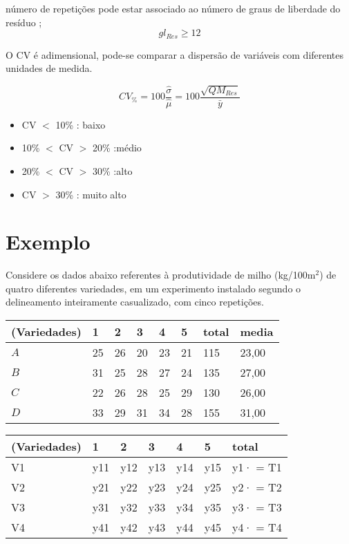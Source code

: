 \documentclass[
]{book}
\begin{document}
número de repetições pode estar associado ao número de graus de liberdade do resíduo ; \[gl_{Res} \geq 12\]

O CV é adimensional, pode-se comparar a dispersão de variáveis
com diferentes unidades de medida.

\[\displaystyle{CV_{\%} = 100\frac{\hat{\sigma}}{\hat{\mu}} = 100\frac{\sqrt{QM_{Res}}}{\bar{y}}}\]

\begin{itemize}
\item
  CV \(<\) 10\% : baixo
\item
  10\% \(<\) CV \(>\) 20\% :médio
\item
  20\% \(<\) CV \(>\) 30\% :alto
\item
  CV \(>\) 30\% : muito alto
\end{itemize}

\hypertarget{exemplo-1}{%
\section{Exemplo}\label{exemplo-1}}

Considere os dados abaixo referentes à produtividade de milho (kg/100m\(^2\)) de quatro diferentes variedades, em um experimento instalado segundo o delineamento inteiramente casualizado, com cinco repetições.

\begin{longtable}[]{@{}llllllll@{}}
\toprule()
(Variedades) & 1 & 2 & 3 & 4 & 5 & total & media \\
\midrule()
\endhead
\(A\) & 25 & 26 & 20 & 23 & 21 & 115 & 23,00 \\
\(B\) & 31 & 25 & 28 & 27 & 24 & 135 & 27,00 \\
\(C\) & 22 & 26 & 28 & 25 & 29 & 130 & 26,00 \\
\(D\) & 33 & 29 & 31 & 34 & 28 & 155 & 31,00 \\
\bottomrule()
\end{longtable}

\begin{longtable}[]{@{}lllllll@{}}
\toprule()
(Variedades) & 1 & 2 & 3 & 4 & 5 & total \\
\midrule()
\endhead
V1 & y11 & y12 & y13 & y14 & y15 & y1· = T1 \\
V2 & y21 & y22 & y23 & y24 & y25 & y2· = T2 \\
V3 & y31 & y32 & y33 & y34 & y35 & y3· = T3 \\
V4 & y41 & y42 & y43 & y44 & y45 & y4· = T4 \\
\bottomrule()
\end{longtable}
\end{document}
